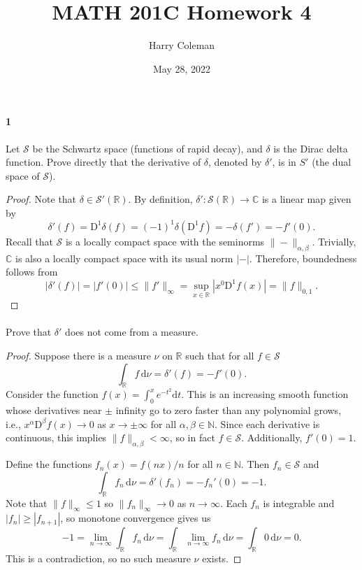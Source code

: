 \documentclass[12pt]{article}
\renewcommand{\maketitle}{\thispagestyle{title}}
\newlength{\myparskip}
\newenvironment{fullbox}{\begin{lrbox}{\savefullbox}\begin{minipage}{\dimexpr\textwidth-2\fboxsep\relax}\setlength{\parskip}{\myparskip}}{\end{minipage}\end{lrbox}\framebox[\textwidth]{\usebox{\savefullbox}}}
\newenvironment{pbox}[1][]{\begin{fullbox}\def\temp{#1}\ifx\temp\empty\else\paragraph{#1}\phantom{}\fi}{\end{fullbox}}
\theoremstyle{definition}
\newcommand{\N}{\mathbb{N}}
\newcommand{\R}{\mathbb{R}}
\newcommand{\C}{\mathbb{C}}
\newcommand{\<}{\langle}
\renewcommand{\>}{\rangle}
\newcommand{\dd}{\mathrm{d}}
\renewcommand{\SS}{\mathcal{S}}
\newcommand{\DD}{\mathrm{D}}
\begin{document}
\title{MATH 201C Homework 4}
\author{Harry Coleman}
\date{May 28, 2022}
\maketitle

\begin{pbox}[1]
    Let $\SS$ be the Schwartz space (functions of rapid decay), and $\delta$ is the Dirac delta function.
    Prove directly that the derivative of $\delta$, denoted by $\delta'$, is in $S'$ (the dual space of $\SS$).
\end{pbox}

\begin{proof}
    Note that $\delta \in \SS'(\R)$.
    By definition, $\delta' : \SS(\R) \to \C$ is a linear map given by
    \[
        \delta'(f)
            = \DD^1\delta(f)
            = (-1)^1\delta(\DD^1\!f)
            = -\delta(f')
            = - f'(0).
    \]
    Recall that $\SS$ is a locally compact space with the seminorms $\|{-}\|_{\alpha,\beta}$.
    Trivially, $\C$ is also a locally compact space with its usual norm $|{-}|$.
    Therefore, boundedness follows from
    \[
        |\delta'(f)|
            = |f'(0)|
            \leq \|f'\|_\infty
            = \sup_{x \in \R} |x^0\DD^1\!f(x)|
            = \|f\|_{0,1}.
    \]
\end{proof}

\begin{pbox}
    Prove that $\delta'$ does not come from a measure.
\end{pbox}

\begin{proof}
    Suppose there is a measure $\nu$ on $\R$ such that for all $f \in \SS$
    \[
        \int_\R f \,\dd{\nu}
            = \delta'(f)
            = -f'(0).
    \]
    Consider the function $f(x) = \int_{0}^{x} e^{-t^2} \dd{t}$.
    This is an increasing smooth function whose derivatives near $\pm$ infinity go to zero faster than any polynomial grows, i.e., $x^\alpha\DD^{\beta}\!f(x) \to 0$ as $x \to \pm\infty$ for all $\alpha, \beta \in \N$.
    Since each derivative is continuous, this implies $\|f\|_{\alpha,\beta} < \infty$, so in fact $f \in \SS$.
    Additionally, $f'(0) = 1$.

    Define the functions $f_n(x) = f(nx)/n$ for all $n \in \N$.
    Then $f_n \in \SS$ and 
    \[
        \int_\R f_n \,\dd{\nu}
            = \delta'(f_n)
            = -f_n'(0)
            = -1.
    \]
    Note that $\|f\|_\infty \leq 1$ so $\|f_n\|_\infty \to 0$ as $n \to \infty$.
    Each $f_n$ is integrable and $|f_n| \geq |f_{n+1}|$, so monotone convergence gives us
    \[
        -1
            = \lim_{n \to \infty} \int_\R f_n \,\dd{\nu}
            = \int_{\R} \lim_{n\to\infty} f_n \,\dd{\nu} 
            = \int_\R 0 \,\dd{\nu}
            = 0.
    \]
    This is a contradiction, so no such measure $\nu$ exists.
\end{proof}
\end{document}
